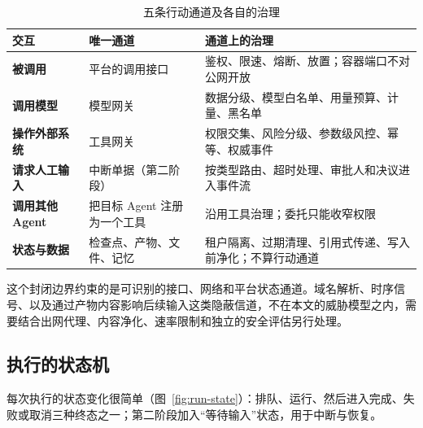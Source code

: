 \begin{table}[htbp]
\centering
\caption{五条行动通道及各自的治理}
\label{tab:windows}
\begin{tabularx}{\textwidth}{@{}>{\bfseries}L{2.6cm}L{4.4cm}Y@{}}
  \toprule
  \textbf{交互} & \textbf{唯一通道} & \textbf{通道上的治理}\\
  \midrule
  被调用 & 平台的调用接口 & 鉴权、限速、熔断、放置；容器端口不对公网开放\\
  调用模型 & 模型网关 & 数据分级、模型白名单、用量预算、计量、黑名单\\
  操作外部系统 & 工具网关 & 权限交集、风险分级、参数级风控、幂等、权威事件\\
  请求人工输入 & 中断单据（第二阶段） & 按类型路由、超时处理、审批人和决议进入事件流\\
  调用其他 Agent & 把目标 Agent 注册为一个工具 & 沿用工具治理；委托只能收窄权限\\
  状态与数据 & 检查点、产物、文件、记忆 & 租户隔离、过期清理、引用式传递、写入前净化；不算行动通道\\
  \bottomrule
\end{tabularx}
\end{table}

这个封闭边界约束的是可识别的接口、网络和平台状态通道。域名解析、时序信号、以及通过产物内容影响后续输入这类隐蔽信道，不在本文的威胁模型之内，需要结合出网代理、内容净化、速率限制和独立的安全评估另行处理。

\subsection{执行的状态机}

每次执行的状态变化很简单（图~\ref{fig:run-state}）：排队、运行、然后进入完成、失败或取消三种终态之一；第二阶段加入“等待输入”状态，用于中断与恢复。

